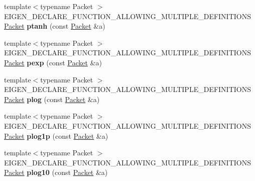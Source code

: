 \begin{DoxyCompactItemize}
\item 
\mbox{\label{namespace_eigen_1_1internal_a847d90eb105f35af5d13fac572688ee2}} 
{\footnotesize template$<$typename Packet $>$ }\\E\+I\+G\+E\+N\+\_\+\+D\+E\+C\+L\+A\+R\+E\+\_\+\+F\+U\+N\+C\+T\+I\+O\+N\+\_\+\+A\+L\+L\+O\+W\+I\+N\+G\+\_\+\+M\+U\+L\+T\+I\+P\+L\+E\+\_\+\+D\+E\+F\+I\+N\+I\+T\+I\+O\+NS \hyperlink{union_eigen_1_1internal_1_1_packet}{Packet} {\bfseries ptanh} (const \hyperlink{union_eigen_1_1internal_1_1_packet}{Packet} \&a)
\item 
\mbox{\label{namespace_eigen_1_1internal_a4e432b17ec36570c3588a088737da8b2}} 
{\footnotesize template$<$typename Packet $>$ }\\E\+I\+G\+E\+N\+\_\+\+D\+E\+C\+L\+A\+R\+E\+\_\+\+F\+U\+N\+C\+T\+I\+O\+N\+\_\+\+A\+L\+L\+O\+W\+I\+N\+G\+\_\+\+M\+U\+L\+T\+I\+P\+L\+E\+\_\+\+D\+E\+F\+I\+N\+I\+T\+I\+O\+NS \hyperlink{union_eigen_1_1internal_1_1_packet}{Packet} {\bfseries pexp} (const \hyperlink{union_eigen_1_1internal_1_1_packet}{Packet} \&a)
\item 
\mbox{\label{namespace_eigen_1_1internal_a3df2f47dad3f497cb70171f03353fccc}} 
{\footnotesize template$<$typename Packet $>$ }\\E\+I\+G\+E\+N\+\_\+\+D\+E\+C\+L\+A\+R\+E\+\_\+\+F\+U\+N\+C\+T\+I\+O\+N\+\_\+\+A\+L\+L\+O\+W\+I\+N\+G\+\_\+\+M\+U\+L\+T\+I\+P\+L\+E\+\_\+\+D\+E\+F\+I\+N\+I\+T\+I\+O\+NS \hyperlink{union_eigen_1_1internal_1_1_packet}{Packet} {\bfseries plog} (const \hyperlink{union_eigen_1_1internal_1_1_packet}{Packet} \&a)
\item 
\mbox{\label{namespace_eigen_1_1internal_aa02c3fd162bc2e5fb066a04e698c1b64}} 
{\footnotesize template$<$typename Packet $>$ }\\E\+I\+G\+E\+N\+\_\+\+D\+E\+C\+L\+A\+R\+E\+\_\+\+F\+U\+N\+C\+T\+I\+O\+N\+\_\+\+A\+L\+L\+O\+W\+I\+N\+G\+\_\+\+M\+U\+L\+T\+I\+P\+L\+E\+\_\+\+D\+E\+F\+I\+N\+I\+T\+I\+O\+NS \hyperlink{union_eigen_1_1internal_1_1_packet}{Packet} {\bfseries plog1p} (const \hyperlink{union_eigen_1_1internal_1_1_packet}{Packet} \&a)
\item 
\mbox{\label{namespace_eigen_1_1internal_a128b9447c98e77e946927d46046d8ccb}} 
{\footnotesize template$<$typename Packet $>$ }\\E\+I\+G\+E\+N\+\_\+\+D\+E\+C\+L\+A\+R\+E\+\_\+\+F\+U\+N\+C\+T\+I\+O\+N\+\_\+\+A\+L\+L\+O\+W\+I\+N\+G\+\_\+\+M\+U\+L\+T\+I\+P\+L\+E\+\_\+\+D\+E\+F\+I\+N\+I\+T\+I\+O\+NS \hyperlink{union_eigen_1_1internal_1_1_packet}{Packet} {\bfseries plog10} (const \hyperlink{union_eigen_1_1internal_1_1_packet}{Packet} \&a)

\end{DoxyCompactItemize}
